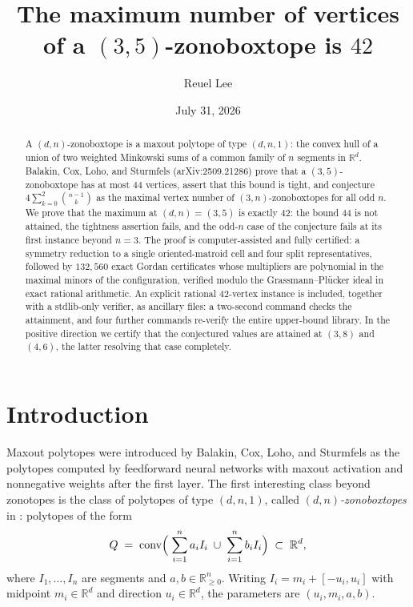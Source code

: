\documentclass[11pt]{amsart}
\title[The maximum vertex number of a $(3,5)$-zonoboxtope is 42]{The maximum number of vertices\\ of a $(3,5)$-zonoboxtope is $42$}
\author{Reuel Lee}
\date{July 31, 2026}
\theoremstyle{remark}
\newcommand{\conv}{\operatorname{conv}}
\newcommand{\RR}{\mathbb{R}}
\begin{document}
\begin{abstract}
A $(d,n)$-zonoboxtope is a maxout polytope of type $(d,n,1)$: the convex
hull of a union of two weighted Minkowski sums of a common family of $n$
segments in $\RR^d$. Balakin, Cox, Loho, and Sturmfels
(arXiv:2509.21286) prove that a $(3,5)$-zonoboxtope has at most $44$
vertices, assert that this bound is tight, and conjecture
$4\sum_{k=0}^{2}\binom{n-1}{k}$ as the maximal vertex number of
$(3,n)$-zonoboxtopes for all odd $n$. We prove that the maximum at
$(d,n)=(3,5)$ is exactly $42$: the bound $44$ is not attained, the
tightness assertion fails, and the odd-$n$ case of the conjecture fails
at its first instance beyond $n=3$. The proof is computer-assisted and
fully certified: a symmetry reduction to a single oriented-matroid cell
and four split representatives, followed by $132{,}560$ exact Gordan
certificates whose multipliers are polynomial in the maximal minors of
the configuration, verified modulo the Grassmann--Pl\"ucker ideal in
exact rational arithmetic. An explicit rational $42$-vertex instance is
included, together with a stdlib-only verifier, as ancillary files: a
two-second command checks the attainment, and four further commands
re-verify the entire upper-bound library. In the positive direction we
certify that the conjectured values are attained at $(3,8)$ and
$(4,6)$, the latter resolving that case completely.
\end{abstract}

\maketitle

\section{Introduction}

Maxout polytopes were introduced by Balakin, Cox, Loho, and Sturmfels
\cite{BCLS} as the polytopes computed by feedforward neural networks
with maxout activation and nonnegative weights after the first layer.
The first interesting class beyond zonotopes is the class of polytopes
of type $(d,n,1)$, called \emph{$(d,n)$-zonoboxtopes} in
\cite[\S 2]{BCLS}:
polytopes of the form
\begin{equation}\label{eq:zbt}
  Q \;=\; \conv\Bigl(\;\sum_{i=1}^{n} a_i I_i \;\cup\; \sum_{i=1}^{n} b_i I_i\Bigr)
  \;\subset\; \RR^d,
\end{equation}
where $I_1,\dots,I_n$ are segments and $a,b\in\RR_{\ge 0}^n$. Writing
$I_i = m_i + [-u_i,u_i]$ with midpoint $m_i\in\RR^d$ and direction
$u_i\in\RR^d$, the parameters are $(u_i, m_i, a, b)$.
\end{document}
